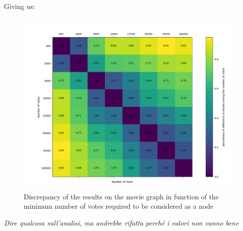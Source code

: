 \nd Giving us:
\begin{figure}[H] \label{matrix-b}
    \centering
    \includegraphics[width=13cm]{Figure_2.png}
    \caption{Discrepancy of the results on the movie graph in function of the minimum number of votes required to be considered as a node}
\end{figure}
\newpage


\s \nd \emph{Dire qualcosa sull'analisi, ma andrebbe rifatta perché i valori non vanno bene}
